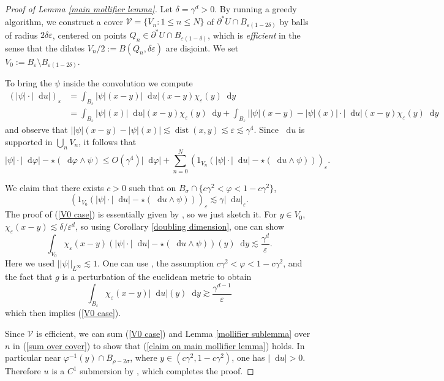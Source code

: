 \documentclass[reqno,10pt]{amsart}
\newcommand*\dif{\mathop{}\!\mathrm{d}}
\DeclareMathOperator{\dist}{dist}
\newcommand{\dfn}[1]{\emph{#1}\index{#1}}
\theoremstyle{definition}
\numberwithin{equation}{section}
\begin{document}
\begin{proof}[Proof of Lemma \ref{main mollifier lemma}]
Let $\delta = \gamma^d > 0$.
By running a greedy algorithm, we construct a cover $\mathcal V = \{V_n: 1 \leq n \leq N\}$ of $\partial^* U \cap B_{\varepsilon(1 - 2\delta)}$ by balls of radius $2\delta\varepsilon$, centered on points $Q_n \in \partial^* U \cap B_{\varepsilon(1 - \delta)}$, which is \dfn{efficient} in the sense that the dilates $V_n/2 := B(Q_n, \delta\varepsilon)$ are disjoint.
We set $V_0 := B_\varepsilon \setminus B_{\varepsilon(1 - 2\delta)}$.

To bring the $\psi$ inside the convolution we compute
\begin{align*}
(|\psi| \cdot |\dif u|)_\varepsilon
&= \int_{B_\varepsilon} |\psi|(x - y) |\dif u|(x - y) \chi_\varepsilon(y) \dif y \\
&= \int_{B_\varepsilon} |\psi|(x) |\dif u|(x - y) \chi_\varepsilon(y) \dif y + \int_{B_\varepsilon} ||\psi|(x - y) - |\psi|(x)| \cdot |\dif u|(x - y) \chi_\varepsilon(y) \dif y
\end{align*}
and observe that $||\psi|(x - y) - |\psi|(x)| \lesssim \dist(x, y) \lesssim \varepsilon \lesssim \gamma^4$.
Since $\dif u$ is supported in $\bigcup_n V_n$, it follows that
\begin{equation}\label{sum over cover}
|\psi| \cdot |\dif \varphi| - \star(\dif \varphi \wedge \psi)
\leq O(\gamma^4) |\dif \varphi| + \sum_{n=0}^N (1_{V_n}(|\psi| \cdot |\dif u| - \star(\dif u \wedge \psi)))_\varepsilon.
\end{equation}

We claim that there exists $c > 0$ such that on $B_\sigma \cap \{c\gamma^2 < \varphi < 1 - c\gamma^2\}$,
\begin{equation}\label{V0 case}
(1_{V_0}(|\psi| \cdot |\dif u| - \star(\dif u \wedge \psi)))_\varepsilon \lesssim \gamma |\dif u|_\varepsilon.
\end{equation}
The proof of (\ref{V0 case}) is essentially given by \cite[pg92]{Giusti77}, so we just sketch it.
For $y \in V_0$, $\chi_\varepsilon(x - y) \lesssim \delta/\varepsilon^d$, so using Corollary \ref{doubling dimension}, one can show
$$\int_{V_0} \chi_\varepsilon(x - y)(|\psi| \cdot |\dif u| - \star(\dif u \wedge \psi))(y) \dif y \lesssim \frac{\gamma^d}{\varepsilon}.$$
Here we used $||\psi||_{L^\infty} \lesssim 1$.
One can use \cite[Lemma 7.1]{Giusti77}, the assumption $c\gamma^2 < \varphi < 1 - c\gamma^2$, and the fact that $g$ is a perturbation of the euclidean metric to obtain
$$\int_{B_\varepsilon} \chi_\varepsilon(x - y) |\dif u|(y) \dif y \gtrsim \frac{\gamma^{d - 1}}{\varepsilon}$$
which then implies (\ref{V0 case}).

Since $\mathcal V$ is efficient, we can sum (\ref{V0 case}) and Lemma \ref{mollifier sublemma} over $n$ in (\ref{sum over cover}) to show that (\ref{claim on main mollifier lemma}) holds.
In particular near $\varphi^{-1}(y) \cap B_{\rho - 2\sigma}$, where $y \in (c\gamma^2, 1 - c\gamma^2)$, one has $|\dif u| > 0$.
Therefore $u$ is a $C^1$ submersion by \cite[Lemma 7.1]{Giusti77}, which completes the proof.
\end{proof}
\end{document}
